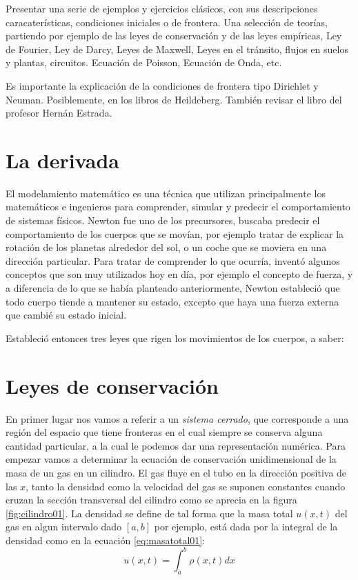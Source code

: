 Presentar una serie de ejemplos y ejercicios clásicos, con sus descripciones
caracaterísticas, condiciones iniciales o de frontera.  Una selección 
de teorías, partiendo por ejemplo de las leyes de conservación y de las 
leyes empíricas, Ley de Fourier, Ley de Darcy, Leyes de Maxwell, Leyes 
en el tránsito, flujos en suelos y plantas, circuitos.
Ecuación de Poisson, Ecuación de Onda, etc.

Es importante la explicación de la condiciones de frontera tipo Dirichlet y Neuman.
Posiblemente, en los libros de Heildeberg. También revisar el libro del profesor 
Hernán Estrada.

\section{La derivada}
El modelamiento matemático es una técnica que utilizan principalmente los matemáticos e ingenieros 
para comprender, simular y predecir el comportamiento de sistemas físicos.  Newton fue uno de 
los precursores, buscaba predecir el comportamiento de los cuerpos que se movían, por ejemplo
tratar de explicar la rotación de los planetas alrededor del sol, o un coche que se moviera en una 
dirección particular.  Para tratar de comprender lo que ocurría, inventó algunos conceptos que son 
muy utilizados hoy en día, por ejemplo el concepto de fuerza, y a diferencia de lo que se había planteado
anteriormente, Newton estableció que todo cuerpo tiende a mantener su estado, excepto que haya una
fuerza externa que cambié su estado inicial.  

Estableció entonces tres leyes que rigen los movimientos de los cuerpos, a saber:

\section{Leyes de conservación}
En primer lugar nos vamos a referir a un \textit{sistema cerrado}, que corresponde a una región 
del espacio que tiene fronteras en el cual siempre se conserva alguna cantidad particular, a la cual
le podemos dar una representación numérica.  Para empezar vamos a determinar la ecuación 
de conservación unidimensional de la masa de un gas en un cilindro. El gas fluye en el tubo en la 
dirección positiva de las $x$, tanto la densidad como la velocidad del gas se suponen constantes cuando
cruzan la sección transversal del cilindro como se aprecia en la figura \ref{fig:cilindro01}. La densidad
se define de tal forma que la masa total $u(x,t)$ del gas en algun intervalo dado $\left[a,b\right]$ 
por ejemplo, está dada por la integral de la densidad como en la ecuación \eqref{eq:masatotal01}:
\begin{equation}\label{eq:masatotal01}
u(x,t)=\int_{a}^{b} \rho(x,t)dx
\end{equation}

